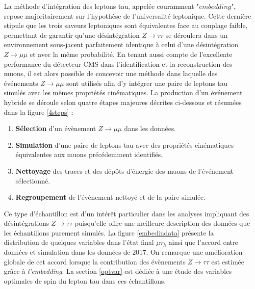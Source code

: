 La méthode d'intégration des leptons tau, appelée couramment $\textit{"embedding"}$, repose majoritairement sur l'hypothèse de l'universalité leptonique. Cette dernière stipule que les trois saveurs leptoniques sont équivalentes face au couplage faible, permettant de garantir qu'une désintégration $Z\rightarrow\tau\tau$ se déroulera dans un environnement sous-jacent parfaitement identique à celui d'une désintégration $Z\rightarrow\mu\mu$ et avec la même probabilité. En tenant aussi compte de l'excellente performance du détecteur CMS dans l'identification et la reconstruction des muons, il est alors possible de concevoir une méthode dans laquelle des événements $Z\rightarrow\mu\mu$ sont utilisés afin d'y intégrer une paire de leptons tau simulés avec les mêmes propriétés cinématiques. La production d'un événement hybride se déroule selon quatre étapes majeures décrites ci-dessous et résumées dans la figure \ref{4steps} :

\begin{enumerate}
    \medskip
    \item \textbf{Sélection} d'un évènement $Z\rightarrow\mu\mu$ dans les données.
    \medskip
    \item \textbf{Simulation} d'une paire de leptons tau avec des propriétés cinématiques équivalentes aux muons précédemment identifiés.
    \medskip
    \item \textbf{Nettoyage} des traces et des dépôts d'énergie des muons de l'événement sélectionné.
    \medskip
    \item \textbf{Regroupement} de l'événement nettoyé et de la paire simulée.
    \medskip
\end{enumerate}

Ce type d'échantillon est d'un intérêt particulier dans les analyses impliquant des désintégrations $Z\rightarrow\tau\tau$ puisqu'elle offre une meilleure description des données que les échantillons purement simulés. La figure \ref{embedindata} présente la distribution de quelques variables dans l'état final $\mu\tau_h$ ainsi que l'accord entre données et simulation dans les données de 2017. On remarque une amélioration globale de cet accord lorsque la contribution des évènements $Z\rightarrow\tau\tau$ est estimée grâce à \textit{l'embedding}. La section \ref{optvar} est dédiée à une étude des variables optimales de spin du lepton tau dans ces échantillons.  \\

